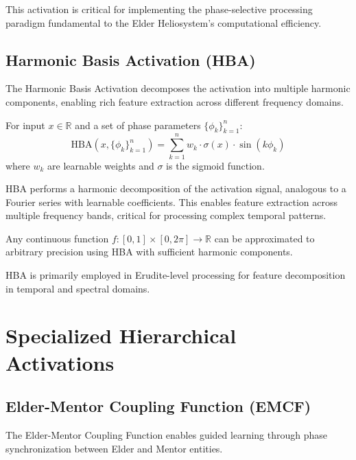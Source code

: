 This activation is critical for implementing the phase-selective processing paradigm fundamental to the Elder Heliosystem's computational efficiency.

\subsection{Harmonic Basis Activation (HBA)}

The Harmonic Basis Activation decomposes the activation into multiple harmonic components, enabling rich feature extraction across different frequency domains.

\begin{definition}
For input $x \in \mathbb{R}$ and a set of phase parameters $\{\phi_k\}_{k=1}^n$:
\begin{equation}
\text{HBA}(x, \{\phi_k\}_{k=1}^n) = \sum_{k=1}^n w_k \cdot \sigma(x) \cdot \sin(k\phi_k)
\end{equation}
where $w_k$ are learnable weights and $\sigma$ is the sigmoid function.
\end{definition}

HBA performs a harmonic decomposition of the activation signal, analogous to a Fourier series with learnable coefficients. This enables feature extraction across multiple frequency bands, critical for processing complex temporal patterns.

\begin{theorem}
Any continuous function $f: [0,1] \times [0,2\pi] \to \mathbb{R}$ can be approximated to arbitrary precision using HBA with sufficient harmonic components.
\end{theorem}

HBA is primarily employed in Erudite-level processing for feature decomposition in temporal and spectral domains.

\section{Specialized Hierarchical Activations}

\subsection{Elder-Mentor Coupling Function (EMCF)}

The Elder-Mentor Coupling Function enables guided learning through phase synchronization between Elder and Mentor entities.


